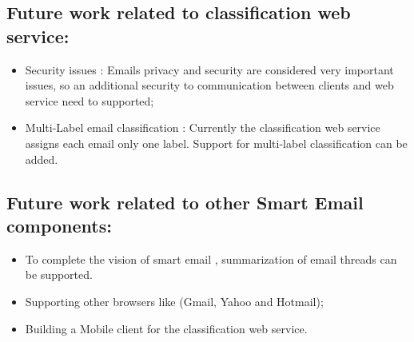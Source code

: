 \subsection{Future work related to classification web service:}
\begin{itemize}
    \item Security issues : Emails privacy and security are considered very
    important issues, so an additional security to communication between clients and
    web service need to supported;
    \item Multi-Label email classification : Currently the classification web
    service assigns each email only one label. Support for multi-label
    classification can be added.
\end{itemize}

\subsection{Future work related to other Smart Email components:}
\begin{itemize}
    \item To complete the vision of smart email ,
        summarization of email threads can be supported.
    \item Supporting other browsers like (Gmail, Yahoo and Hotmail);
    \item Building a Mobile client for the classification web service.
\end{itemize}


